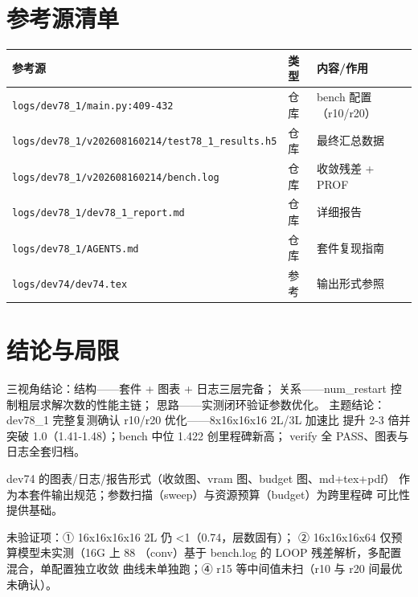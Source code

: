 \documentclass[UTF8]{ctexart}
\begin{document}
\section{参考源清单}
\begin{xltabular}{\textwidth}{llX}
\toprule
\textcolor{evidence}{参考源} & 类型 & 内容/作用 \\
\midrule
\endhead
\texttt{\nolinkurl{logs/dev78_1/main.py:409-432}} & 仓库 & bench 配置（r10/r20） \\
\texttt{\nolinkurl{logs/dev78_1/v202608160214/test78_1_results.h5}} & 仓库 & 最终汇总数据 \\
\texttt{\nolinkurl{logs/dev78_1/v202608160214/bench.log}} & 仓库 & 收敛残差 + PROF \\
\texttt{\nolinkurl{logs/dev78_1/dev78_1_report.md}} & 仓库 & 详细报告 \\
\texttt{\nolinkurl{logs/dev78_1/AGENTS.md}} & 仓库 & 套件复现指南 \\
\texttt{\nolinkurl{logs/dev74/dev74.tex}} & 参考 & 输出形式参照 \\
\bottomrule
\end{xltabular}

\section{结论与局限}
\begin{conclbox}
三视角结论：\textcolor{struct}{结构}——套件 + 图表 + 日志三层完备；
\textcolor{relation}{关系}——num\_restart 控制粗层求解次数的性能主链；
\textcolor{idea}{思路}——实测闭环验证参数优化。
主题结论：dev78\_1 完整复测确认 r10/r20 优化——8x16x16x16 2L/3L 加速比
提升 2-3 倍并突破 1.0（1.41-1.48）；bench 中位 1.422 创里程碑新高；
verify 全 PASS、图表与日志全套归档。
\end{conclbox}
\begin{refbox}
dev74 的图表/日志/报告形式（收敛图、vram 图、budget 图、md+tex+pdf）
作为本套件输出规范；参数扫描（sweep）与资源预算（budget）为跨里程碑
可比性提供基础。
\end{refbox}
\begin{warnbox}
\textcolor{warn}{未验证}项：① 16x16x16x16 2L 仍 <1（0.74，层数固有）；
② 16x16x16x64 仅预算模型未实测（16G 上 88%
（conv）基于 bench.log 的 LOOP 残差解析，多配置混合，单配置独立收敛
曲线未单独跑；④ r15 等中间值未扫（r10 与 r20 间最优未确认）。
\end{warnbox}
\end{document}
